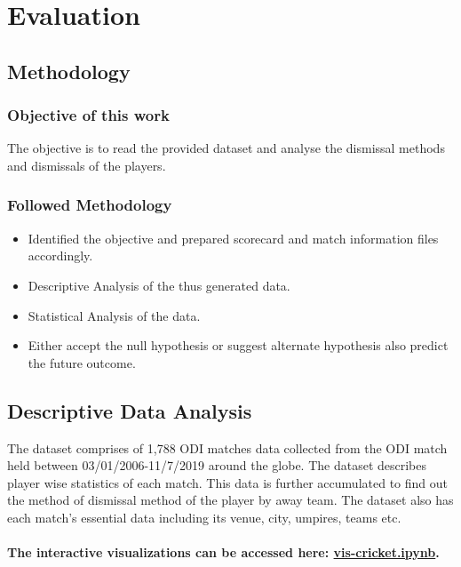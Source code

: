 \documentclass[fleqn,10pt]{wlscirep}
\begin{document}
\section{Evaluation}
\subsection{Methodology}
\subsubsection{Objective of this work}
The objective is to read the provided dataset and analyse the dismissal methods and dismissals of the players.
\subsubsection{Followed Methodology}
\begin{itemize}
    \item Identified the objective and prepared scorecard and match information files accordingly.
    \item Descriptive Analysis of the thus generated data.
    \item Statistical Analysis of the data.
    \item Either accept the null hypothesis or suggest alternate hypothesis also predict the future outcome.
\end{itemize}
\subsection{Descriptive Data Analysis}
The dataset comprises of 1,788 ODI matches data collected from the ODI match held between 03/01/2006-11/7/2019 around the globe. 
The dataset describes player wise statistics of each match. This data is further accumulated to find out the 
method of dismissal method of the player by away team. 
The dataset also has each match's essential data including its venue, city, umpires, teams etc.\newline
\paragraph{The interactive visualizations can be accessed here: \href{https://nbviewer.jupyter.org/github/dev-SB/cricket-bi/blob/master/vis-cricket.ipynb}{vis-cricket.ipynb}.}
\end{document}

